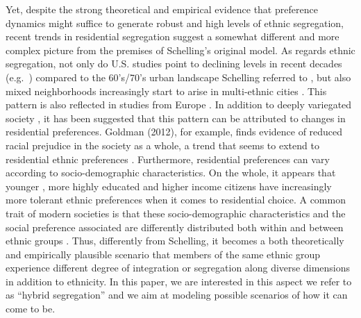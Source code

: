 \documentclass[
]{article}
\begin{document}
Yet, despite the strong theoretical and empirical evidence that
preference dynamics might suffice to generate robust and high levels of
ethnic segregation, recent trends in residential segregation suggest a
somewhat different and more complex picture from the premises of
Schelling's original model. As regards ethnic segregation, not only do
U.S. studies point to declining levels in recent decades
(e.g.~\cite{glaeser2012end}) compared to the 60's/70's urban landscape
\citep{clark2015residential} Schelling referred to
\citep{schelling1969models}, but also mixed neighborhoods increasingly
start to arise in multi-ethnic cities
\citep{clark2015residential, lee2012racial}. This pattern is also
reflected in studies from Europe \citep{blokland2010people}. In addition
to deeply variegated society \citep{lee2012racial}, it has been
suggested that this pattern can be attributed to changes in residential
preferences. Goldman (2012), for example, finds evidence of reduced
racial prejudice in the society as a whole, a trend that seems to extend
to residential ethnic preferences \citep{xie2012modeling}. Furthermore,
residential preferences can vary according to socio-demographic
characteristics. On the whole, it appears that younger
\citep{clark2018can, clark2009changing}, more highly educated and higher
income citizens have increasingly more tolerant ethnic preferences
\citep{clark2019neighborhood,crowder2012neighborhood,clark2009changing,xie2012modeling}
when it comes to residential choice. A common trait of modern societies
is that these socio-demographic characteristics and the social
preference associated are differently distributed both within
\citep{clark2002residential,crul2017upcoming} and between ethnic groups
\citep{clark2009changing,crowder2012neighborhood}. Thus, differently
from Schelling, it becomes a both theoretically and empirically
plausible scenario that members of the same ethnic group experience
different degree of integration or segregation along diverse dimensions
in addition to ethnicity. In this paper, we are interested in this
aspect we refer to as ``hybrid segregation'' and we aim at modeling
possible scenarios of how it can come to be.
\end{document}
